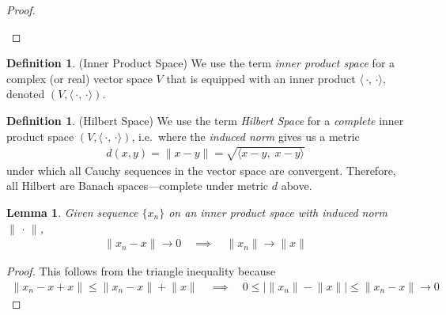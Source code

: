 \documentclass[12pt]{article}
\numberwithin{equation}{section} %
\theoremstyle{plain}
\newtheorem{lem}[thm]{Lemma}
\theoremstyle{definition}
\newtheorem{defn}[thm]{Definition}
\theoremstyle{remark}
\newcommand{\ra}{\rightarrow}
\begin{document}
\begin{proof}
\begin{enumerate}[label=(\roman*)]
\end{enumerate}
\end{proof}


\begin{defn}(Inner Product Space)
We use the term \emph{inner product space} for a complex (or real)
vector space $V$ that is equipped with an inner product
$\langle\,\cdot,\,\cdot\rangle$, denoted
$(V,\langle\,\cdot,\,\cdot\rangle)$.
\end{defn}

\begin{defn}(Hilbert Space)
We use the term \emph{Hilbert Space} for a \emph{complete} inner product
space $(V,\langle\,\cdot,\,\cdot\rangle)$,
i.e.\ where the \emph{induced norm} gives us a metric
\begin{align*}
  d(x,y) = \lVert x-y\rVert
  = \sqrt{\langle x-y,\; x-y\rangle}
\end{align*}
under which all Cauchy sequences in the vector space are convergent.
Therefore, all Hilbert are Banach spaces---complete under metric $d$
above.
\end{defn}

\begin{lem}
Given sequence $\{x_n\}$ on an inner product space with induced norm
$\lVert\,\cdot\,\rVert$,
\begin{align*}
  \lVert x_n - x \rVert \ra 0
  \quad\implies\quad
  \lVert x_n \rVert \ra
  \lVert x \rVert
\end{align*}
\end{lem}
\begin{proof}
This follows from the triangle inequality because
\begin{align*}
  \lVert x_n - x + x\rVert
  \leq
  \lVert x_n - x\rVert + \lVert x\rVert
  \quad\implies\quad
  0 \leq
  \big\lvert
  \lVert x_n\rVert - \lVert x\rVert
  \big\rvert
  \leq
  \lVert x_n - x\rVert
  \ra 0
\end{align*}
\end{proof}
\end{document}
